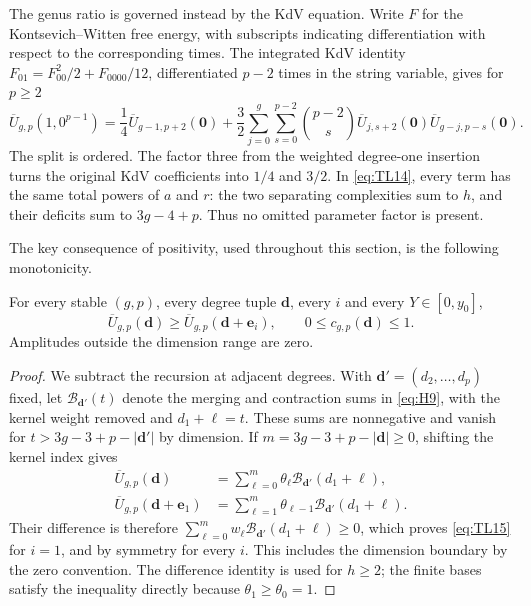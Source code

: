 The genus ratio is governed instead by the KdV equation. Write $F$ for the Kontsevich--Witten free energy, with subscripts indicating differentiation with respect to the corresponding times. The integrated KdV identity \(F_{01}=F_{00}^2/2+F_{0000}/12\),
differentiated \(p-2\) times in the string variable, gives for \(p\ge2\)
\begin{equation}
\overline U_{g,p}(1,0^{p-1})
 =\frac14\overline U_{g-1,p+2}(\mathbf0)
 +\frac32\sum_{j=0}^g\sum_{s=0}^{p-2}\binom{p-2}s
 \overline U_{j,s+2}(\mathbf0)
 \overline U_{g-j,p-s}(\mathbf0).
 \label{eq:TL14}
\end{equation} The split is ordered. The factor three from the weighted degree-one
insertion turns the original KdV coefficients into \(1/4\) and \(3/2\).
In \eqref{eq:TL14}, every term has the same total powers of \(a\) and \(r\): the
two separating complexities sum to \(h\), and their deficits sum to
\(3g-4+p\). Thus no omitted parameter factor is present.

The key consequence of positivity, used throughout this section, is the
following monotonicity.

\begin{lemma}\label{lem:monotone}
For every stable \((g,p)\), every degree tuple \(\mathbf d\), every \(i\) and
every \(Y\in[0,y_0]\),
\begin{equation}
\overline U_{g,p}(\mathbf d)\ge
 \overline U_{g,p}(\mathbf d+\mathbf e_i),
 \qquad 0\le c_{g,p}(\mathbf d)\le1.
 \label{eq:TL15}
\end{equation}
Amplitudes outside the dimension range are zero.
\end{lemma}

\begin{proof}
We subtract the recursion at adjacent degrees. With
$\mathbf d'=(d_2,\ldots,d_p)$ fixed, let
$\mathcal B_{\mathbf d'}(t)$ denote the merging and contraction sums
in \eqref{eq:H9}, with the kernel weight removed and $d_1+\ell=t$.
These sums are nonnegative and vanish for
$t>3g-3+p-|\mathbf d'|$ by dimension. If
$m=3g-3+p-|\mathbf d|\ge0$, shifting the kernel index gives
\[
 \begin{aligned}
 \overline U_{g,p}(\mathbf d)
   &=\sum_{\ell=0}^m\theta_\ell
                      \mathcal B_{\mathbf d'}(d_1+\ell),\\
 \overline U_{g,p}(\mathbf d+\mathbf e_1)
   &=\sum_{\ell=1}^m\theta_{\ell-1}
                      \mathcal B_{\mathbf d'}(d_1+\ell).
 \end{aligned}
\]
Their difference is therefore
$\sum_{\ell=0}^m w_\ell\mathcal B_{\mathbf d'}(d_1+\ell)\ge0$, which proves
\eqref{eq:TL15} for \(i=1\), and by symmetry for every \(i\). This includes
the dimension boundary by the zero convention. The difference identity is
used for $h\ge2$; the finite bases satisfy the inequality directly because
\(\theta_1\ge\theta_0=1\).
\end{proof}

